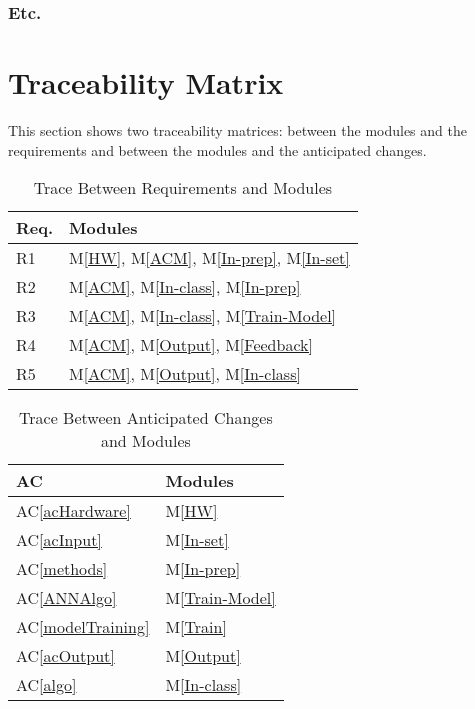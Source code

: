 \documentclass[12pt, titlepage]{article}
\newcommand{\acref}[1]{AC\ref{#1}}
\newcommand{\mref}[1]{M\ref{#1}}
\begin{document}
\subsubsection{Etc.}

\section{Traceability Matrix} \label{SecTM}

This section shows two traceability matrices: between the modules and the
requirements and between the modules and the anticipated changes.

\begin{table}[H]
\centering
\begin{tabular}{p{} p{}}
\toprule
\textbf{Req.} & \textbf{Modules}\\
\midrule
R1 & \mref{HW}, \mref{ACM}, \mref{In-prep}, \mref{In-set}\\
R2 & \mref{ACM}, \mref{In-class}, \mref{In-prep}\\
R3 & \mref{ACM}, \mref{In-class}, \mref{Train-Model}\\
R4 & \mref{ACM}, \mref{Output}, \mref{Feedback}\\
R5 & \mref{ACM}, \mref{Output}, \mref{In-class}\\
\bottomrule
\end{tabular}
\caption{Trace Between Requirements and Modules}
\label{TblRT}
\end{table}

\begin{table}[H]
\centering
\begin{tabular}{p{} p{}}
\toprule
\textbf{AC} & \textbf{Modules}\\
\midrule
\acref{acHardware} & \mref{HW}\\
\acref{acInput} & \mref{In-set}\\
\acref{methods} & \mref{In-prep}\\
\acref{ANNAlgo} & \mref{Train-Model}\\
\acref{modelTraining} & \mref{Train}\\
\acref{acOutput} & \mref{Output}\\
\acref{algo} & \mref{In-class}\\
\bottomrule
\end{tabular}
\caption{Trace Between Anticipated Changes and Modules}
\label{TblACT}
\end{table}
\end{document}
